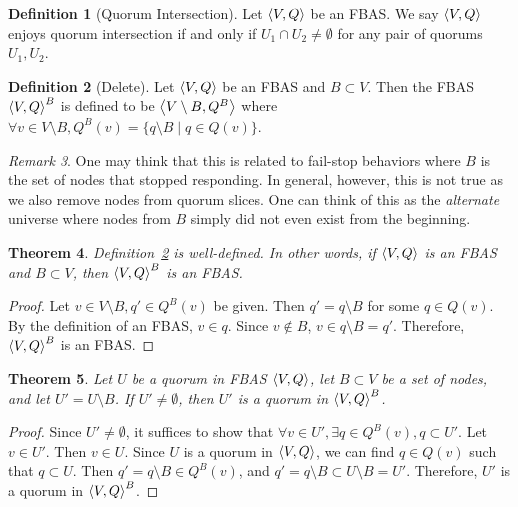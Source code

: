 \documentclass[12pt, psamsfonts]{amsart}
\newtheorem{thm}{Theorem}[subsection]
\theoremstyle{definition}
\newtheorem{defn}[thm]{Definition}
\theoremstyle{remark}
\newtheorem{rem}[thm]{Remark}
\numberwithin{equation}{subsection}
\begin{document}
\begin{defn}[Quorum Intersection]
    Let $\ev{V, Q}$ be an FBAS\@.
    We say $\ev{V, Q}$ enjoys quorum intersection if and only if $U_1 \cap U_2 \ne \emptyset$ for any pair of quorums $U_1, U_2$.
\end{defn}

\begin{defn}[Delete]\label{delete_fbas}
    Let $\ev{V, Q}$ be an FBAS and $B \subset V$.
    Then the FBAS $\ev{V, Q}^B$ is defined to be $\ev{V \setminus B, Q^B}$ where $\forall v \in V \setminus B, Q^B(v) = \{ q \setminus B \mid q \in Q(v) \}$.
\end{defn}

\begin{rem}
    One may think that this is related to fail-stop behaviors where $B$ is the set of nodes that stopped responding.
    In general, however, this is not true as we also remove nodes from quorum slices.
    One can think of this as the \textit{alternate} universe where nodes from $B$ simply did not even exist from the beginning.
\end{rem}

\begin{thm}
    Definition~\ref{delete_fbas} is well-defined.
    In other words, if $\ev{V, Q}$ is an FBAS and $B \subset V$, then $\ev{V, Q}^B$ is an FBAS\@.
\end{thm}

\begin{proof}
    Let $v \in V \setminus B, q' \in Q^B(v)$ be given.
    Then $q' = q \setminus B$ for some $q \in Q(v)$.
    By the definition of an FBAS, $v \in q$.
    Since $v \notin B$, $v \in q \setminus B = q'$.
    Therefore, $\ev{V, Q}^B$ is an FBAS\@.
\end{proof}

\begin{thm}\label{quorum_delete_fbas}
    Let $U$ be a quorum in FBAS $\ev{V, Q}$, let $B \subset V$ be a set of nodes, and let $U' = U \setminus B$.
    If $U' \ne \emptyset$, then $U'$ is a quorum in $\ev{V, Q}^B$.
\end{thm}

\begin{proof}
    Since $U' \ne \emptyset$, it suffices to show that $\forall v \in U', \exists q \in Q^B(v), q \subset U'$.
    Let $v \in U'$.
    Then $v \in U$.
    Since $U$ is a quorum in $\ev{V, Q}$, we can find $q \in Q(v)$ such that $q \subset U$.
    Then $q' = q \setminus B \in Q^B(v)$, and $q' = q \setminus B \subset U \setminus B = U'$.
    Therefore, $U'$ is a quorum in $\ev{V, Q}^B$.
\end{proof}
\end{document}

